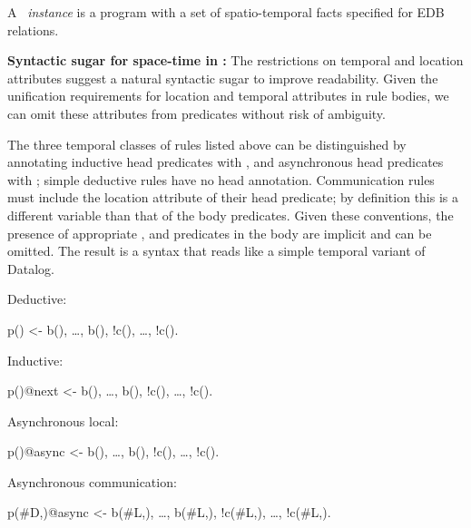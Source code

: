 A \lang\ {\em instance} is a program with a set of spatio-temporal facts specified for EDB relations.

\noindent
\textbf{Syntactic sugar for space-time in \lang:}
The restrictions on temporal and location attributes suggest a natural syntactic sugar to improve readability.  Given the unification requirements for location and temporal attributes in rule bodies, we can omit these attributes from predicates without risk of ambiguity.  

The three temporal classes of rules listed above can be distinguished by annotating inductive head predicates with , and asynchronous head predicates with ; simple deductive rules have no head annotation. 
Communication rules must include the location attribute of their head predicate; by definition this is a different variable than that of the body predicates.
 Given these conventions, the presence of appropriate ,  and  predicates in the body are implicit and can be omitted.  The result is a syntax that reads like a simple temporal variant of Datalog.

Deductive:

\begin{Dedalus}
p() <- b(), \ldots, b(),
!c(), \ldots, !c().
\end{Dedalus}

Inductive:

\begin{Dedalus}
p()@next <- b(), \ldots, b(),   
!c(), \ldots, !c().
\end{Dedalus}

Asynchronous local:

\begin{Dedalus}
p()@async <- b(), \ldots, b(),
!c(), \ldots, !c().
\end{Dedalus}

Asynchronous communication:

\begin{Dedalus}
p(#D,)@async <- b(#L,), \ldots, b(#L,),
!c(#L,), \ldots, !c(#L,).
\end{Dedalus}

